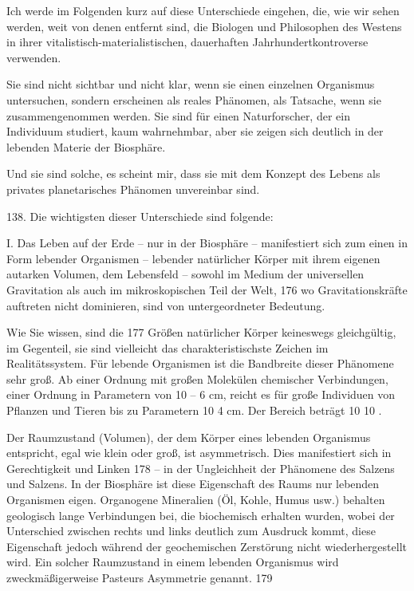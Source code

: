 \documentclass[11pt,a4paper]{book}
\begin{document}
Ich werde im Folgenden kurz auf diese Unterschiede eingehen, die, wie wir sehen werden, weit von denen entfernt sind, die Biologen und Philosophen des Westens in ihrer vitalistisch-materialistischen, dauerhaften Jahrhundertkontroverse verwenden.



Sie sind nicht sichtbar und nicht klar, wenn sie einen einzelnen Organismus untersuchen, sondern erscheinen als reales Phänomen, als Tatsache, wenn sie zusammengenommen werden. Sie sind für einen Naturforscher, der ein Individuum studiert, kaum wahrnehmbar, aber sie zeigen sich deutlich in der lebenden Materie der Biosphäre.



Und sie sind solche, es scheint mir, dass sie mit dem Konzept des Lebens als privates planetarisches Phänomen unvereinbar sind.



138. Die wichtigsten dieser Unterschiede sind folgende:



I. Das Leben auf der Erde -- nur in der Biosphäre -- manifestiert sich zum einen in Form lebender Organismen -- lebender natürlicher Körper mit ihrem eigenen autarken Volumen, dem Lebensfeld -- sowohl im Medium der universellen Gravitation als auch im mikroskopischen Teil der Welt, 176 wo Gravitationskräfte auftreten nicht dominieren, sind von untergeordneter Bedeutung.



Wie Sie wissen, sind die 177 Größen natürlicher Körper keineswegs gleichgültig, im Gegenteil, sie sind vielleicht das charakteristischste Zeichen im Realitätssystem. Für lebende Organismen ist die Bandbreite dieser Phänomene sehr groß. Ab einer Ordnung mit großen Molekülen chemischer Verbindungen, einer Ordnung in Parametern von 10 -- 6 cm, reicht es für große Individuen von Pflanzen und Tieren bis zu Parametern 10 4 cm. Der Bereich beträgt 10 10 .



Der Raumzustand (Volumen), der dem Körper eines lebenden Organismus entspricht, egal wie klein oder groß, ist asymmetrisch. Dies manifestiert sich in Gerechtigkeit und Linken 178 -- in der Ungleichheit der Phänomene des Salzens und Salzens. In der Biosphäre ist diese Eigenschaft des Raums nur lebenden Organismen eigen. Organogene Mineralien (Öl, Kohle, Humus usw.) behalten geologisch lange Verbindungen bei, die biochemisch erhalten wurden, wobei der Unterschied zwischen rechts und links deutlich zum Ausdruck kommt, diese Eigenschaft jedoch während der geochemischen Zerstörung nicht wiederhergestellt wird. Ein solcher Raumzustand in einem lebenden Organismus wird zweckmäßigerweise Pasteurs Asymmetrie genannt. 179
\end{document}
